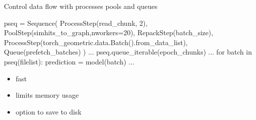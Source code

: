 \documentclass[lualatex,handout,aspectratio=1610]{beamer}
\begin{document}
\begin{frame}[t,fragile]{Control data flow with processes pools and queues}
	\begin{python}
		pseq = Sequence(
		ProcessStep(read_chunk, 2),
		PoolStep(simhits_to_graph,nworkers=20),
		RepackStep(batch_size),
		ProcessStep(torch_geometric.data.Batch().from_data_list),
		Queue(prefetch_batches)
		)
		...
		pseq.queue_iterable(epoch_chunks)
		...
		for batch in pseq(filelist):
		prediction = model(batch)
		...
	\end{python}
	\begin{itemize}
		\item fast
		\item limits memory usage
		\item option to save to disk
	\end{itemize}
\end{frame}
\end{document}
